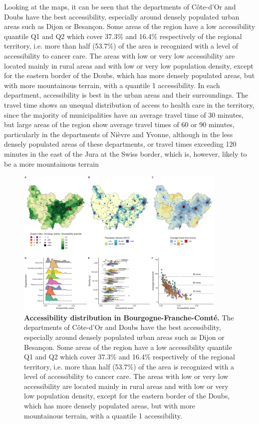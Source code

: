 Looking at the maps, it can be seen that the departments of Côte-d'Or and Doubs
have the best accessibility, especially around densely populated urban areas
such as Dijon or Besançon. Some areas of the region have a low accessibility
quantile Q1 and Q2 which cover 37.3\% and 16.4\% respectively of the regional
territory, i.e. more than half (53.7\%) of the area is recognized with a level
of accessibility to cancer care. The areas with low or very low accessibility
are located mainly in rural areas and with low or very low population density,
except for the eastern border of the Doubs, which has more densely populated
areas, but with more mountainous terrain, with a quantile 1 accessibility. In
each department, accessibility is best in the urban areas and their
surroundings. The travel time shows an unequal distribution of access to health
care in the territory, since the majority of municipalities have an average
travel time of 30 minutes, but large areas of the region show average travel
times of 60 or 90 minutes, particularly in the departments of Nièvre and Yvonne,
although in the less densely populated areas of these departments, or travel
times exceeding 120 minutes in the east of the Jura at the Swiss border, which
is, however, likely to be a more mountainous terrain

\begin{figure}[H]
    \includegraphics[width=0.9\textwidth]{images/camion/region_accessibility/accessibility_Bourgogne-Franche-Comte.png}
    \centering
    \caption{ \textbf{Accessibility distribution in Bourgogne-Franche-Comté.}
        The departments of Côte-d'Or and Doubs have the best accessibility,
        especially around densely populated urban areas such as Dijon or
        Besançon. Some areas of the region have a low accessibility quantile Q1
        and Q2 which cover 37.3\% and 16.4\% respectively of the regional
        territory, i.e. more than half (53.7\%) of the area is recognized with a
        level of accessibility to cancer care. The areas with low or very low
        accessibility are located mainly in rural areas and with low or very low
        population density, except for the eastern border of the Doubs, which
        has more densely populated areas, but with more mountainous terrain,
        with a quantile 1 accessibility. }
\end{figure}

